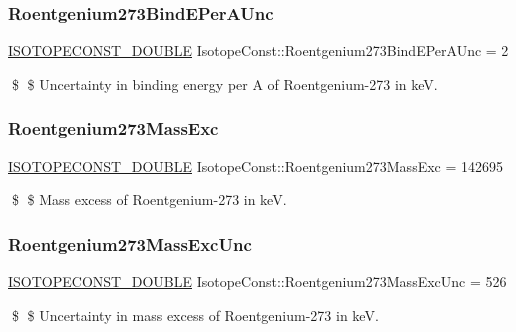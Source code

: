 \subsubsection{\texorpdfstring{Roentgenium273\+Bind\+E\+Per\+A\+Unc}{Roentgenium273BindEPerAUnc}}
{\footnotesize\ttfamily \mbox{\hyperlink{group___isotope_const-_macros_ga8f45a7272ce02c0b4c65c44636ed719a}{I\+S\+O\+T\+O\+P\+E\+C\+O\+N\+S\+T\+\_\+\+D\+O\+U\+B\+LE}} Isotope\+Const\+::\+Roentgenium273\+Bind\+E\+Per\+A\+Unc = 2}

\$ \$ Uncertainty in binding energy per A of Roentgenium-\/273 in keV. \mbox{\label{group___isotope_const-_roentgenium-_rg273_gaecba0c08e7bca121d8aa89217f83321a}} 
\subsubsection{\texorpdfstring{Roentgenium273\+Mass\+Exc}{Roentgenium273MassExc}}
{\footnotesize\ttfamily \mbox{\hyperlink{group___isotope_const-_macros_ga8f45a7272ce02c0b4c65c44636ed719a}{I\+S\+O\+T\+O\+P\+E\+C\+O\+N\+S\+T\+\_\+\+D\+O\+U\+B\+LE}} Isotope\+Const\+::\+Roentgenium273\+Mass\+Exc = 142695}

\$ \$ Mass excess of Roentgenium-\/273 in keV. \mbox{\label{group___isotope_const-_roentgenium-_rg273_ga5b9d2b1257128b650083d2693ed2f1a6}} 
\subsubsection{\texorpdfstring{Roentgenium273\+Mass\+Exc\+Unc}{Roentgenium273MassExcUnc}}
{\footnotesize\ttfamily \mbox{\hyperlink{group___isotope_const-_macros_ga8f45a7272ce02c0b4c65c44636ed719a}{I\+S\+O\+T\+O\+P\+E\+C\+O\+N\+S\+T\+\_\+\+D\+O\+U\+B\+LE}} Isotope\+Const\+::\+Roentgenium273\+Mass\+Exc\+Unc = 526}

\$ \$ Uncertainty in mass excess of Roentgenium-\/273 in keV. \mbox{\label{group___isotope_const-_roentgenium-_rg273_ga08154050e2538adf661326588b192941}} 
